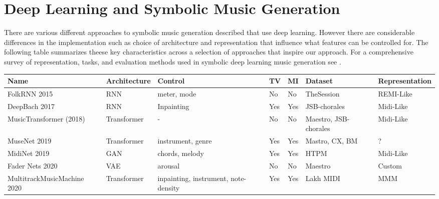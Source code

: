 \section{Deep Learning and Symbolic Music Generation}
There are various different approaches to symbolic music generation described that use deep learning. However there are considerable differences in the implementation such as choice of architecture and representation that influence what features can be controlled for. The following table summarizes theese key characteristics across a selection of approaches that inspire our approach. For a comprehensive survey of representation, tasks, and evaluation methods used in symbolic deep learning music generation see \cite{Ji_Yang_Luo_survey_symbolic_2024}. 

\begin{table}[H] \label{bigtable}
    \centering
    \renewcommand{\arraystretch}{1.2} %
    \setlength{\tabcolsep}{3pt} %
    \scriptsize %
    \begin{tabular}{|p{2.5cm}|p{1.8cm}|p{3cm}|p{1cm}|p{1cm}|p{3cm}|p{2.5cm}|}
        \hline
        \textbf{Name} & \textbf{Architecture} & \textbf{Control} & \textbf{TV} & \textbf{MI} & \textbf{Dataset} & \textbf{Representation} \\
        \hline
        FolkRNN 2015 \cite{Sturm_Ben-Tal_2016} & RNN & meter, mode & No & No & TheSession\cite{sessionfolkdata} & REMI-Like\\
        DeepBach 2017 \cite{Hadjeres_Pachet_Nielsen_2017} & RNN & Inpainting & Yes & Yes & JSB-chorales\cite{jsbchorales} & Midi-Like\\ 
        MusicTransformer (2018) \cite{Huang_Vaswani_Uszkoreit_Shazeer_Simon_Hawthorne_Dai_Hoffman_Dinculescu_Eck_2018} & Transformer & - & No & No & Maestro\cite{hawthorne2018maestro},  JSB-chorales\cite{jsbchorales} & Midi-Like\\
        MuseNet 2019 \cite{Christine_2019} & Transformer & instrument, genre & Yes & Yes & Mastro\cite{hawthorne2018maestro}, CX\cite{classicalarchives}, BM\cite{bitmidi} & ?\\
        MidiNet 2019 \cite{midinet} & GAN & chords, melody & Yes & Yes & HTPM\cite{hooktheorypopmidi} & Midi-Like\\
        Fader Nets 2020\cite{Tan_Herremans_2020} & VAE & arousal & No & No & Maestro \cite{hawthorne2018maestro} & Custom \\
        MultitrackMusicMachine 2020 \cite{Ens_Pasquier_2020_MMM} & Transformer & inpainting, instrument, note-density & Yes & Yes & Lakh MIDI\cite{Raffel_2016} & MMM\\

\end{tabular}
\end{table}
